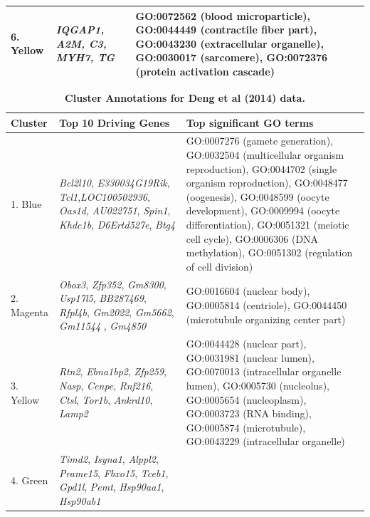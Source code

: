 \documentclass[10pt,letterpaper]{article}
\begin{document}
\begin{table}[!hp]
\begin{adjustwidth}{-2in}{0in}
\begin{tabular}{|p{1.0in}|p{1.5in}|p{4.3in}|}
\hline
6. Yellow & \textit{IQGAP1, A2M, C3, MYH7, TG} & GO:0072562 (blood microparticle), GO:0044449 (contractile fiber part), GO:0043230 (extracellular organelle), GO:0030017 (sarcomere), GO:0072376 (protein activation cascade) \\
\hline
\end{tabular} \label{tab2}
\end{adjustwidth}
 \end{table}



\begin{table}[!hp]
\begin{adjustwidth}{-2in}{0in} %
\footnotesize
\centering
\caption{\bf Cluster Annotations for Deng et al (2014) data.}
\renewcommand{\arraystretch}{1.7}
\begin{tabular}{|p{1.0in}|p{1.5in}|p{4.3in}|}
\hline
Cluster & Top 10 Driving \qquad Genes &  Top significant GO terms \\
\hline
1. Blue & \textit{Bcl2l10}, \textit{E330034G19Rik}, \textit{Tcl1},\textit{LOC100502936}, \textit{Oas1d}, \textit{AU022751}, \textit{Spin1}, \textit{Khdc1b}, \textit{D6Ertd527e}, \textit{Btg4} & GO:0007276 (gamete generation), GO:0032504 (multicellular organism reproduction), GO:0044702 (single organism reproduction), GO:0048477 (oogenesis), GO:0048599 (oocyte development), GO:0009994 (oocyte differentiation), GO:0051321 (meiotic cell cycle), GO:0006306 (DNA methylation), GO:0051302 (regulation of cell division)\\
\hline
2. Magenta & \textit{Obox3}, \textit{Zfp352}, \textit{Gm8300}, \textit{Usp17l5}, \textit{BB287469}, \textit{Rfpl4b}, \textit{Gm2022}, \textit{Gm5662}, \textit{Gm11544 }, \textit{Gm4850}
& GO:0016604 (nuclear body), GO:0005814 (centriole), GO:0044450 (microtubule organizing center part) \\
\hline
3. Yellow & \textit{Rtn2}, \textit{Ebna1bp2}, \textit{Zfp259}, \textit{Nasp}, \textit{Cenpe}, \textit{Rnf216}, \textit{Ctsl}, \textit{Tor1b}, \textit{Ankrd10}, \textit{Lamp2} & GO:0044428 (nuclear part), GO:0031981 (nuclear lumen), GO:0070013 (intracellular organelle lumen), GO:0005730 (nucleolus), GO:0005654 (nucleoplasm),  GO:0003723 (RNA binding), GO:0005874 (microtubule), GO:0043229 (intracellular organelle)\\
\hline
4. Green
&  \textit{Timd2}, \textit{Isyna1}, \textit{Alppl2}, \textit{Prame15},  \textit{Fbxo15}, \textit{Tceb1}, \textit{Gpd1l}, \textit{Pemt}, \textit{Hsp90aa1}, \textit{Hsp90ab1}

\end{tabular}
\end{adjustwidth}
\end{table}
\end{document}
